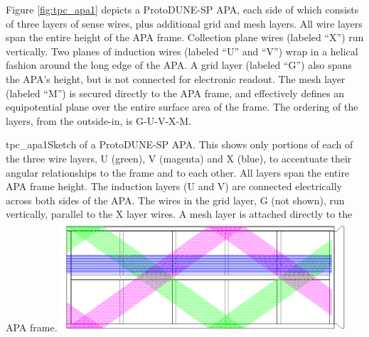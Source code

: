 %
Figure \ref{fig:tpc_apa1} depicts a ProtoDUNE-SP APA, each  side of which consists of three layers of sense wires, plus additional grid and mesh layers.  All wire layers span the entire height of the APA frame. Collection plane wires (labeled ``X'') run vertically.  Two planes of induction wires (labeled ``U'' and ``V'') wrap in a helical fashion around the long edge of the APA.  A grid layer (labeled ``G'') also spans the APA's height, but is not connected for electronic readout.  The mesh layer (labeled ``M'') is secured directly to the APA frame, and effectively defines an equipotential plane over the entire surface area of the frame.  The ordering of the layers, from the outside-in, is G-U-V-X-M. 

\begin{cdrfigure}{tpc_apa1}{Sketch of a ProtoDUNE-SP APA. This shows only portions of each of the three wire layers, U (green), V (magenta) and X (blue), to accentuate their angular relationships to the frame and to each other.  All layers span the entire APA frame height. The induction layers (U and V) are connected electrically across both sides of the APA.  The wires in the grid layer, G (not shown), run vertically, parallel to the X layer wires.  A mesh layer is attached directly to the APA frame.}
\includegraphics[width=0.8\textwidth, angle=90]{figures/tpc_apa1.png} 
\end{cdrfigure}

